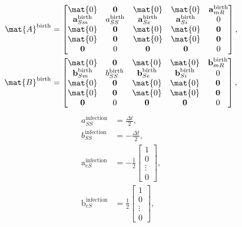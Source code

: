 \documentclass{jpmarticle}
\renewcommand{\vec}[1]{\boldsymbol{\mathrm{#1}}}
\begin{document}
\begin{equation}
  \begin{split}
    \mat{A}^{\text{birth}} &=
    \begin{bmatrix}
      \mat{0} & \vec{0} & \mat{0} & \mat{0} & \vec{a}_{mR}^{\text{birth}}
      \\
      \vec{a}_{Sm}^{\text{birth}} & a_{SS}^{\text{birth}} &
      \vec{a}_{Se}^{\text{birth}} & \vec{a}_{Si}^{\text{birth}} & 0
      \\
      \mat{0} & \vec{0} & \mat{0} & \mat{0} & \vec{0}
      \\
      \mat{0} & \vec{0} & \mat{0} & \mat{0} & \vec{0}
      \\
      \vec{0} & 0 & \vec{0} & \vec{0} & 0
    \end{bmatrix},
    \\
    \mat{B}^{\text{birth}} &=
    \begin{bmatrix}
      \mat{0} & \vec{0} & \mat{0} & \mat{0} & \vec{b}_{mR}^{\text{birth}}
      \\
      \vec{b}_{Sm}^{\text{birth}} & b_{SS}^{\text{birth}} &
      \vec{b}_{Se}^{\text{birth}} & \vec{b}_{Si}^{\text{birth}} & 0
      \\
      \mat{0} & \vec{0} & \mat{0} & \mat{0} & \vec{0}
      \\
      \mat{0} & \vec{0} & \mat{0} & \mat{0} & \vec{0}
      \\
      \vec{0} & 0 & \vec{0} & \vec{0} & 0
    \end{bmatrix},
  \end{split}
\end{equation}
\begin{equation}
  \begin{split}
    a_{SS}^{\text{infection}} &=
    \frac{\Delta t}{2},
    \\
    b_{SS}^{\text{infection}} &=
    - \frac{\Delta t}{2},
    \\
    \vec{a}_{eS}^{\text{infection}} &=
    - \frac{1}{2}
    \begin{bmatrix}
      1 \\ 0 \\ \vdots \\ 0
    \end{bmatrix},
    \\
    \vec{b}_{eS}^{\text{infection}} &=
    \frac{1}{2}
    \begin{bmatrix}
      1 \\ 0 \\ \vdots \\ 0
    \end{bmatrix},
  \end{split}
\end{equation}
\end{document}
